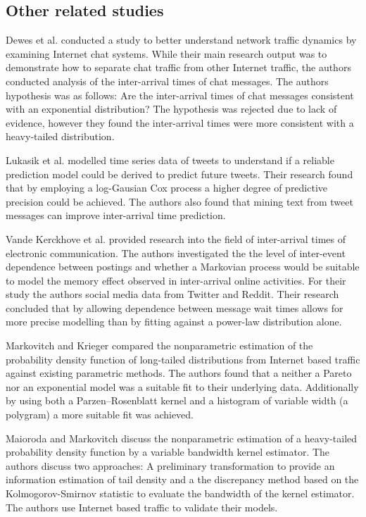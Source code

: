 \documentclass[conference]{IEEEtran}
\begin{document}
\subsection{Other related studies}

Dewes et al. \cite{dewes2003analysis} conducted a study to better understand network traffic dynamics by examining Internet chat systems. While their main research output was to demonstrate how to separate chat traffic from other Internet traffic, the authors conducted analysis of the inter-arrival times of chat messages. The authors hypothesis was as follows: Are the inter-arrival times of chat messages consistent with an exponential distribution? The hypothesis was rejected due to lack of evidence, however they found the inter-arrival times were more consistent with a heavy-tailed distribution.

Lukasik et al. \cite{lukasik2015modeling} modelled time series data of tweets to understand if a reliable prediction model could be derived to predict future tweets. Their research found that by employing a log-Gausian Cox process a higher degree of predictive precision could be achieved. The authors also found that mining text from tweet messages can improve inter-arrival time prediction.

Vande Kerckhove et al. \cite{vande2015markov} provided research into the field of inter-arrival times of electronic communication. The authors investigated the the level of inter-event dependence between postings and whether a Markovian process would be suitable to model the memory effect observed in inter-arrival online activities. For their study the authors social media data from Twitter and Reddit. Their research concluded that by allowing dependence between message wait times allows for more precise modelling than by fitting against a power-law distribution alone.

Markovitch and Krieger \cite{markovitch2000nonparametric} compared the nonparametric estimation of the probability density function of long-tailed distributions from Internet based traffic against existing parametric methods. The authors found that a neither a Pareto nor an exponential model was a suitable fit to their underlying data. Additionally by using both a Parzen--Rosenblatt kernel and a histogram of variable width (a polygram) a more suitable fit was achieved.

Maioroda and Markovitch \cite{maiboroda2004estimation} discuss the nonparametric estimation of a heavy-tailed probability density function by a variable bandwidth kernel estimator. The authors discuss two approaches: A preliminary transformation to provide an information estimation of tail density and a the discrepancy method based on the Kolmogorov-Smirnov statistic to evaluate the bandwidth of the kernel estimator. The authors use Internet based traffic to validate their models.
\end{document}
